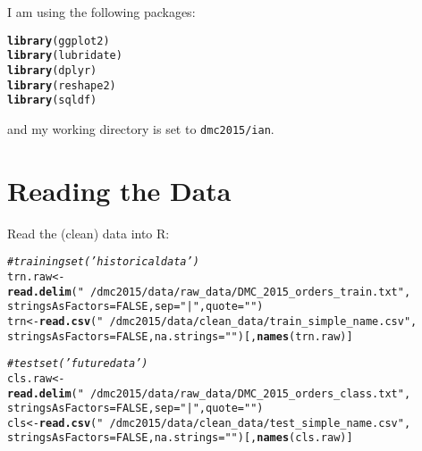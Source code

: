 \documentclass[10pt]{report}
\makeatletter
\newcommand{\hlnum}[1]{\textcolor[rgb]{0.686,0.059,0.569}{#1}}%
\newcommand{\hlstr}[1]{\textcolor[rgb]{0.192,0.494,0.8}{#1}}%
\newcommand{\hlcom}[1]{\textcolor[rgb]{0.678,0.584,0.686}{\textit{#1}}}%
\newcommand{\hlstd}[1]{\textcolor[rgb]{0.345,0.345,0.345}{#1}}%
\newcommand{\hlkwb}[1]{\textcolor[rgb]{0.69,0.353,0.396}{#1}}%
\newcommand{\hlkwc}[1]{\textcolor[rgb]{0.333,0.667,0.333}{#1}}%
\newcommand{\hlkwd}[1]{\textcolor[rgb]{0.737,0.353,0.396}{\textbf{#1}}}%
\newenvironment{kframe}{%
 \def\at@end@of@kframe{}%
 \ifinner\ifhmode%
  \def\at@end@of@kframe{\end{minipage}}%
  \begin{minipage}{\columnwidth}%
 \fi\fi%
 \def\FrameCommand##1{\hskip\@totalleftmargin \hskip-\fboxsep
 \colorbox{shadecolor}{##1}\hskip-\fboxsep
     \hskip-\linewidth \hskip-\@totalleftmargin \hskip\columnwidth}%
 \MakeFramed {\advance\hsize-\width
   \@totalleftmargin\z@ \linewidth\hsize
   \@setminipage}}%
 {\par\unskip\endMakeFramed%
 \at@end@of@kframe}
\newenvironment{knitrout}{}{} %
\makeatother
\begin{document}
%


\titleheader
I am using the following packages:
\begin{knitrout}
\color{fgcolor}\begin{kframe}
\begin{alltt}
\hlkwd{library}\hlstd{(ggplot2)}
\hlkwd{library}\hlstd{(lubridate)}
\hlkwd{library}\hlstd{(dplyr)}
\hlkwd{library}\hlstd{(reshape2)}
\hlkwd{library}\hlstd{(sqldf)}
\end{alltt}
\end{kframe}
\end{knitrout}
and my working directory is set to \verb!dmc2015/ian!.
\section{Reading the Data}
Read the (clean) data into R:
\begin{knitrout}
\color{fgcolor}\begin{kframe}
\begin{alltt}
\hlcom{# training set ('historical data')}
\hlstd{trn.raw} \hlkwb{<-} \hlkwd{read.delim}\hlstd{(}\hlstr{"~/dmc2015/data/raw_data/DMC_2015_orders_train.txt"}\hlstd{,}
    \hlkwc{stringsAsFactors} \hlstd{=} \hlnum{FALSE}\hlstd{,} \hlkwc{sep} \hlstd{=} \hlstr{"|"}\hlstd{,} \hlkwc{quote} \hlstd{=} \hlstr{""}\hlstd{)}
\hlstd{trn} \hlkwb{<-} \hlkwd{read.csv}\hlstd{(}\hlstr{"~/dmc2015/data/clean_data/train_simple_name.csv"}\hlstd{,}
    \hlkwc{stringsAsFactors} \hlstd{=} \hlnum{FALSE}\hlstd{,} \hlkwc{na.strings} \hlstd{=} \hlstr{""}\hlstd{)[,} \hlkwd{names}\hlstd{(trn.raw)]}

\hlcom{# test set ('future data')}
\hlstd{cls.raw} \hlkwb{<-} \hlkwd{read.delim}\hlstd{(}\hlstr{"~/dmc2015/data/raw_data/DMC_2015_orders_class.txt"}\hlstd{,}
    \hlkwc{stringsAsFactors} \hlstd{=} \hlnum{FALSE}\hlstd{,} \hlkwc{sep} \hlstd{=} \hlstr{"|"}\hlstd{,} \hlkwc{quote} \hlstd{=} \hlstr{""}\hlstd{)}
\hlstd{cls} \hlkwb{<-} \hlkwd{read.csv}\hlstd{(}\hlstr{"~/dmc2015/data/clean_data/test_simple_name.csv"}\hlstd{,}
    \hlkwc{stringsAsFactors} \hlstd{=} \hlnum{FALSE}\hlstd{,} \hlkwc{na.strings} \hlstd{=} \hlstr{""}\hlstd{)[,} \hlkwd{names}\hlstd{(cls.raw)]}
\end{alltt}
\end{kframe}
\end{knitrout}
\end{document}
